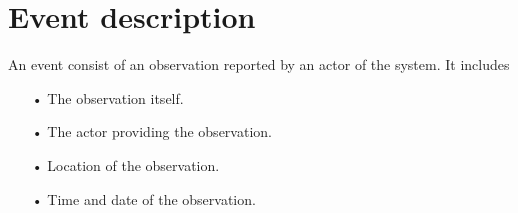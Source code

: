 \section{Event description}
An event consist of an observation reported by an actor of the system. It includes 

\begin{enumerate}
\item[•] The observation itself.
\item[•] The actor providing the observation.
\item[•] Location of the observation.
\item[•] Time and date of the observation. 
\end{enumerate}
